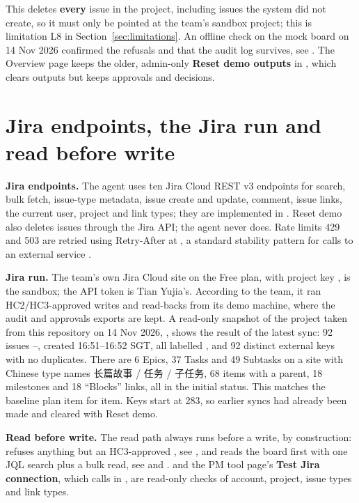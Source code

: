 This deletes \textbf{every} issue in the project, including issues the system did not create, so it must only be pointed at the team's sandbox project; this is limitation L8 in Section~\ref{sec:limitations}. An offline check on the mock board on 14 Nov 2026 confirmed the refusals and that the audit log survives, see . The Overview page keeps the older, admin-only \textbf{Reset demo outputs} in , which clears outputs but keeps approvals and decisions.

\section{Jira endpoints, the Jira run and read before write}

\textbf{Jira endpoints.} The agent uses ten Jira Cloud REST v3 endpoints for search, bulk fetch, issue-type metadata, issue create and update, comment, issue links, the current user, project and link types; they are implemented in . Reset demo also deletes issues through the Jira API; the agent never does. Rate limits 429 and 503 are retried using Retry-After at , a standard stability pattern for calls to an external service \parencite{nygard2018}.

\textbf{Jira run.} The team's own Jira Cloud site on the Free plan, with project key , is the sandbox; the API token is Tian Yujia's. According to the team, it ran HC2/HC3-approved writes and read-backs from its demo machine, where the audit and approvals exports are kept. A read-only snapshot of the project taken from this repository on 14 Nov 2026, , shows the result of the latest sync: 92 issues --, created 16:51--16:52 SGT, all labelled , and 92 distinct external keys with no duplicates. There are 6 Epics, 37 Tasks and 49 Subtasks on a site with Chinese type names 长篇故事 / 任务 / 子任务, 68 items with a parent, 18 milestones and 18 ``Blocks'' links, all in the initial status. This matches the baseline plan item for item. Keys start at 283, so earlier syncs had already been made and cleared with Reset demo.

\textbf{Read before write.} The read path always runs before a write, by construction:  refuses anything but an HC3-approved , see , and  reads the board first with one JQL search plus a bulk read, see  and .  and the PM tool page's \textbf{Test Jira connection}, which calls  in , are read-only checks of account, project, issue types and link types.
